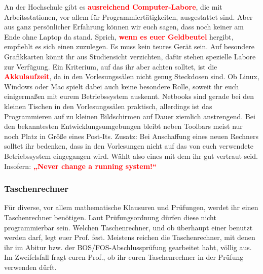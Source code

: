 An der Hochschule gibt es \textcolor{red}{\textbf{ausreichend Computer-Labore}}, die mit Arbeitsstationen, vor allem für Programmiertätigkeiten, ausgestattet sind. Aber aus ganz persönlicher Erfahrung können wir euch sagen, dass noch keiner am Ende ohne Laptop da stand. Sprich, \textcolor{red}{\textbf{wenn es euer Geldbeutel}} hergibt, empfiehlt es sich einen zuzulegen. Es muss kein teures Gerät sein. Auf besondere Grafikkarten könnt ihr aus Studiensicht verzichten, dafür stehen spezielle Labore zur Verfügung. Ein Kriterium, auf das ihr aber achten solltet, ist die \textcolor{red}{\textbf{Akkulaufzeit}}, da in den Vorlesungssälen nicht genug Steckdosen sind. Ob Linux, Windows oder Mac spielt dabei auch keine besondere Rolle, soweit ihr euch einigermaßen mit eurem Betriebssystem auskennt. Netbooks sind gerade bei den kleinen Tischen in den Vorlesungssälen praktisch, allerdings ist das Programmieren auf zu kleinen Bildschirmen
auf Dauer ziemlich anstrengend. Bei den bekanntesten Entwicklungsumgebungen bleibt neben Toolbars meist nur noch Platz in Größe eines Post-Its.\doublebreak
Zusatz: Bei Anschaffung eines neuen Rechners solltet ihr bedenken, dass in den Vorlesungen nicht auf das von euch verwendete Betriebssystem eingegangen wird. Wählt also eines mit dem ihr gut vertraut seid.\doublebreak
Insofern: \textcolor{red}{\textbf{„Never change a running system!“}}

\subsubsection{Taschenrechner}

Für diverse, vor allem mathematische Klausuren und Prüfungen, werdet ihr einen Taschenrechner benötigen. Laut Prüfungsordnung dürfen diese nicht programmierbar sein. Welchen Taschenrechner, und ob überhaupt einer benutzt werden darf, legt euer Prof. fest. Meistens reichen die Taschenrechner, mit denen ihr im Abitur bzw.
der BOS/FOS-Abschlussprüfung gearbeitet habt, völlig aus. Im Zweifelsfall fragt euren Prof., ob ihr euren Taschenrechner in der Prüfung verwenden dürft.